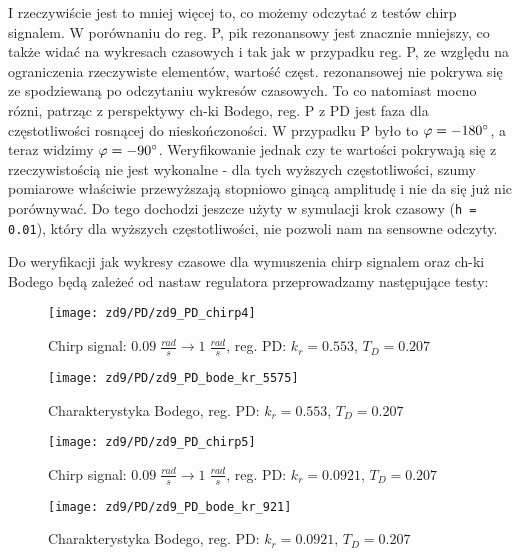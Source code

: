 \documentclass[11 pt]{article}
\begin{document}
I rzeczywiście jest to mniej więcej to, co możemy odczytać z testów chirp signalem. W porównaniu do reg. P, pik rezonansowy jest znacznie mniejszy, co także widać na wykresach czasowych i tak jak w przypadku reg. P, ze względu na ograniczenia rzeczywiste elementów, wartość częst. rezonansowej nie pokrywa się ze spodziewaną po odczytaniu wykresów czasowych. To co natomiast mocno rózni, patrząc z perspektywy ch-ki Bodego, reg. P z PD jest faza dla częstotliwości rosnącej do nieskończoności. W przypadku P było to $\varphi = -180\degree$, a teraz widzimy $\varphi = -90\degree$. Weryfikowanie jednak czy te wartości pokrywają się z rzeczywistością nie jest wykonalne - dla tych wyższych częstotliwości, szumy pomiarowe właściwie przewyższają stopniowo ginącą amplitudę i nie da się już nic porównywać. Do tego dochodzi jeszcze użyty w symulacji krok czasowy (\texttt{h = 0.01}), który dla wyższych częstotliwości, nie pozwoli nam na sensowne odczyty.

Do weryfikacji jak wykresy czasowe dla wymuszenia chirp signalem oraz ch-ki Bodego będą zależeć od nastaw regulatora przeprowadzamy następujące testy:

\renewcommand{\w}{0.855}
 
\begin{figure}[h!]
	\centerline{
	\texttt{[image: zd9/PD/zd9\_PD\_chirp4]}
	}
	\caption{Chirp signal: $0.09 \; \frac{rad}{s} \rightarrow 1 \; \frac{rad}{s}$, reg. PD: $k_r = 0.553$, $T_D = 0.207$}
	\label{fig:pd_chirp2}
\end{figure}

\newpage

\begin{figure}[h!]
	\centerline{
	\texttt{[image: zd9/PD/zd9\_PD\_bode\_kr\_5575]}
	}
	\caption{Charakterystyka Bodego, reg. PD: $k_r = 0.553$, $T_D = 0.207$}
	\label{fig:pd_bode2}
\end{figure}

\begin{figure}[h!]
	\centerline{
	\texttt{[image: zd9/PD/zd9\_PD\_chirp5]}
	}
	\caption{Chirp signal: $0.09 \; \frac{rad}{s} \rightarrow 1 \; \frac{rad}{s}$, reg. PD: $k_r = 0.0921$, $T_D = 0.207$}
	\label{fig:pd_chirp1}
\end{figure}

\begin{figure}[h!]
	\centerline{
	\texttt{[image: zd9/PD/zd9\_PD\_bode\_kr\_921]}
	}
	\caption{Charakterystyka Bodego, reg. PD: $k_r = 0.0921$, $T_D = 0.207$}
	\label{fig:pd_chirp_k_end}
	\label{fig:pd_bode1}
\end{figure}
\end{document}
